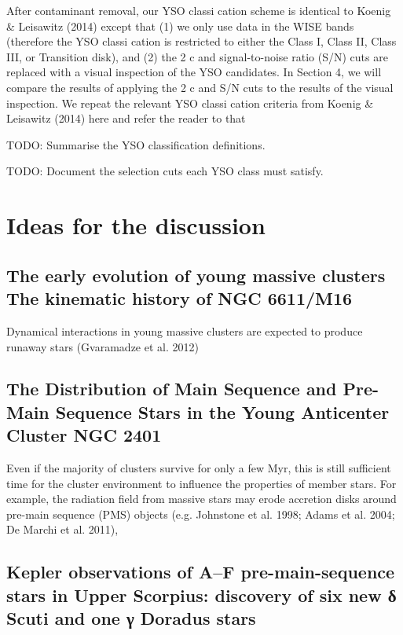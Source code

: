 \documentclass[../main.tex]{subfiles}
\begin{document}
{After contaminant removal, our YSO classi cation scheme is
identical to Koenig & Leisawitz (2014) except that (1) we only
use data in the WISE bands (therefore the YSO classi cation is
restricted to either the Class I, Class II, Class III, or Transition
disk), and (2) the 2
c and signal-to-noise ratio (S/N) cuts are
replaced with a visual inspection of the YSO candidates. In
Section 4, we will compare the results of applying the 2
c and
S/N cuts to the results of the visual inspection.
We repeat the relevant YSO classi cation criteria from
Koenig & Leisawitz (2014) here and refer the reader to that

TODO: Summarise the YSO classification definitions.

TODO: Document the selection cuts each YSO class must satisfy.

\section{Ideas for the discussion}
\subsection{The early evolution of young massive clusters
	The kinematic history of NGC 6611/M16}
Dynamical interactions in
young massive clusters are expected to produce runaway stars
(Gvaramadze et al. 2012)

\subsection{The Distribution of Main Sequence and Pre-Main Sequence Stars
	in the Young Anticenter Cluster NGC 2401}

Even if the majority of clusters survive for only a few Myr, this is still suﬃcient time
for the cluster environment to influence the properties of member stars. For example, the
radiation field from massive stars may erode accretion disks around pre-main sequence (PMS)
objects (e.g. Johnstone et al. 1998; Adams et al. 2004; De Marchi et al. 2011),

\subsection{Kepler observations of A–F pre-main-sequence stars in Upper Scorpius:
	discovery of six new δ Scuti and one γ Doradus stars}

}
\end{document}
